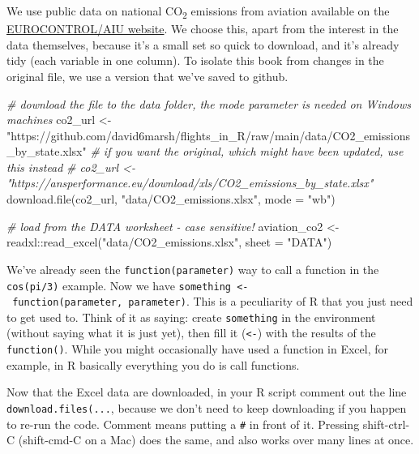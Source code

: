 \documentclass[
]{book}
\newenvironment{Shaded}{\begin{snugshade}}{\end{snugshade}}
\newcommand{\AttributeTok}[1]{\textcolor[rgb]{0.77,0.63,0.00}{#1}}
\newcommand{\CommentTok}[1]{\textcolor[rgb]{0.56,0.35,0.01}{\textit{#1}}}
\newcommand{\FunctionTok}[1]{\textcolor[rgb]{0.00,0.00,0.00}{#1}}
\newcommand{\NormalTok}[1]{#1}
\newcommand{\OtherTok}[1]{\textcolor[rgb]{0.56,0.35,0.01}{#1}}
\newcommand{\SpecialCharTok}[1]{\textcolor[rgb]{0.00,0.00,0.00}{#1}}
\newcommand{\StringTok}[1]{\textcolor[rgb]{0.31,0.60,0.02}{#1}}
\begin{document}
We use public data on national CO\textsubscript{2} emissions from aviation available on the \href{https://ansperformance.eu/data/}{EUROCONTROL/AIU website}. We choose this, apart from the interest in the data themselves, because it's a small set so quick to download, and it's already tidy (each variable in one column). To isolate this book from changes in the original file, we use a version that we've saved to github.

\begin{Shaded}
\begin{Highlighting}[]
\CommentTok{\# download the file to the data folder, the \textquotesingle{}mode\textquotesingle{} parameter is needed on Windows machines}
\NormalTok{co2\_url }\OtherTok{\textless{}{-}} \StringTok{"https://github.com/david6marsh/flights\_in\_R/raw/main/data/CO2\_emissions\_by\_state.xlsx"}
\CommentTok{\# if you want the original, which might have been updated, use this instead}
\CommentTok{\# co2\_url \textless{}{-} "https://ansperformance.eu/download/xls/CO2\_emissions\_by\_state.xlsx"}
\FunctionTok{download.file}\NormalTok{(co2\_url, }\StringTok{"data/CO2\_emissions.xlsx"}\NormalTok{, }\AttributeTok{mode =} \StringTok{"wb"}\NormalTok{)}

  
\CommentTok{\# load from the DATA worksheet {-} case sensitive!}
\NormalTok{aviation\_co2 }\OtherTok{\textless{}{-}}\NormalTok{ readxl}\SpecialCharTok{::}\FunctionTok{read\_excel}\NormalTok{(}\StringTok{"data/CO2\_emissions.xlsx"}\NormalTok{, }
                                  \AttributeTok{sheet =} \StringTok{"DATA"}\NormalTok{) }
\end{Highlighting}
\end{Shaded}

We've already seen the \texttt{function(parameter)} way to call a function in the \texttt{cos(pi/3)} example. Now we have \texttt{something\ \textless{}-\ function(parameter,\ parameter)}. This is a peculiarity of R that you just need to get used to. Think of it as saying: create \texttt{something} in the environment (without saying what it is just yet), then fill it (\texttt{\textless{}-}) with the results of the \texttt{function()}. While you might occasionally have used a function in Excel, for example, in R basically everything you do is call functions.

Now that the Excel data are downloaded, in your R script comment out the line \texttt{download.files(...}, because we don't need to keep downloading if you happen to re-run the code. Comment means putting a \texttt{\#} in front of it. Pressing shift-ctrl-C (shift-cmd-C on a Mac) does the same, and also works over many lines at once.
\end{document}
